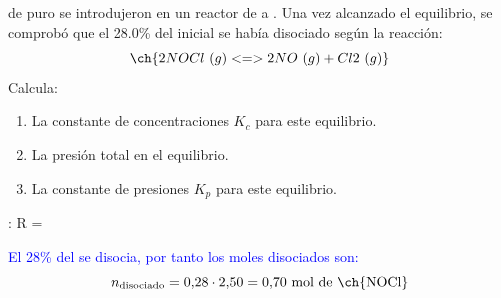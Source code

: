 \begin{exerciseEVAU}
     de  puro se introdujeron en un reactor de  a . Una vez alcanzado el equilibrio, se comprobó que el 28.0\% del  inicial se había disociado según la reacción:
    \begin{equation*}
        \ch{2 NOCl\ (g) <=> 2 NO\ (g) + Cl2\ (g)}
    \end{equation*}
    Calcula:
    \begin{enumerate}[label=\letraminuscula]
        \item La constante de concentraciones \(K_c\) para este equilibrio.
        \item La presión total en el equilibrio.
        \item La constante de presiones \(K_p\) para este equilibrio.
    \end{enumerate}
    \datos{}: R = \ctegases

    \begin{solu}

    \textcolor{blue}{El 28\% del  se disocia, por tanto los moles disociados son:}
    \[
        n_{\text{disociado}} = 0{,}28\cdot2{,}50 = 0{,}70 \text{ mol de \ch{NOCl}}
    \]


\end{solu}
\end{exerciseEVAU}
